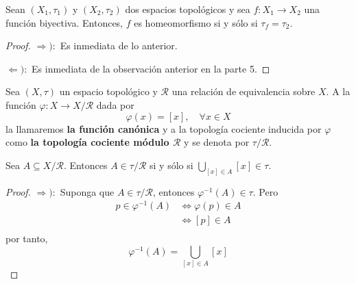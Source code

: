 \documentclass[12pt]{report}
\theoremstyle{largebreak}
\newcommand\cf[3]{\ensuremath{#1:#2\rightarrow#3}}
\begin{document}
    \begin{cor}
        Sean $(X_1,\tau_1)$ y $(X_2,\tau_2)$ dos espacios topológicos y sea $\cf{f}{X_1}{X_2}$ una función biyectiva. Entonces, $f$ es homeomorfismo si y sólo si $\tau_f=\tau_2$.
    \end{cor}

    \begin{proof}
        $\Rightarrow):$ Es inmediata de lo anterior.

        $\Leftarrow):$ Es inmediata de la observación anterior en la parte 5.
    \end{proof}

    \begin{mydef}
        Sea $(X,\tau)$ un espacio topológico y $\mathcal{R}$ una relación de equivalencia sobre $X$. A la función $\cf{\varphi}{X}{X/\mathcal{R}}$ dada por
        \begin{equation*}
            \varphi(x)=[x],\quad\forall x\in X
        \end{equation*}
        la llamaremos \textbf{la función canónica} y a la topología cociente inducida por $\varphi$ como \textbf{la topología cociente módulo $\mathcal{R}$} y se denota por $\tau/\mathcal{R}$.
    \end{mydef}

    \begin{obs}
        Sea $A\subseteq X/\mathcal{R}$. Entonces $A\in\tau/\mathcal{R}$ si y sólo si $\bigcup_{ [x]\in A}[x]\in\tau$.
    \end{obs}

    \begin{proof}
        $\Rightarrow):$ Suponga que $A\in\tau/\mathcal{R}$, entonces $\varphi^{-1}(A)\in\tau$. Pero
        \begin{equation*}
            \begin{split}
                p\in\varphi^{-1}(A)&\iff \varphi(p)\in A\\
                &\iff [p]\in A\\
            \end{split}
        \end{equation*}
        por tanto,
        \begin{equation*}
            \varphi^{-1}(A)=\bigcup_{ [x]\in A}[x]
        \end{equation*}
    \end{proof}
\end{document}
